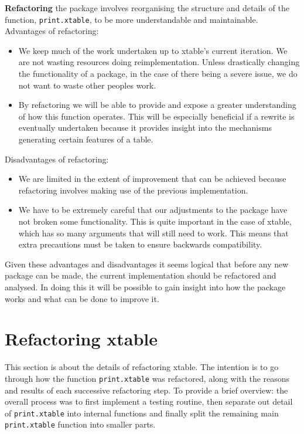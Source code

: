 \documentclass{memoir}\usepackage[]{graphicx}\usepackage[]{color}
\newcommand{\pkg}[1]{{\fontseries{b}\selectfont #1}}
\let\code=\texttt
\begin{document}
\textbf{Refactoring} the package involves reorganising the structure and details of the function, \code{print.xtable}, to be more understandable and maintainable.\\%

\noindent Advantages of refactoring:
\begin{itemize}
\item We keep much of the work undertaken up to \pkg{xtable's} current iteration. We are not wasting resources doing reimplementation. Unless drastically changing the functionality of a package, in the case of there being a severe issue, we do not want to waste other peoples work.
\item By refactoring we will be able to provide and expose a greater understanding of how this function operates. This will be especially beneficial if a rewrite is eventually undertaken because it provides insight into the mechanisms generating certain features of a table.
\end{itemize}
Disadvantages of refactoring:
\begin{itemize}
\item We are limited in the extent of improvement that can be achieved because refactoring involves making use of the previous implementation.
\item We have to be extremely careful that our adjustments to the package have not broken some functionality. This is quite important in the case of \pkg{xtable}, which has so many arguments that will still need to work. This means that extra precautions must be taken to ensure backwards compatibility.
\end{itemize}

Given these advantages and disadvantages it seems logical that before any new package can be made, the current implementation should be refactored and analysed. In doing this it will be possible to gain insight into how the package works and what can be done to improve it. 

\chapter{Refactoring xtable}

This section is about the details of refactoring \pkg{xtable}. The intention is to go through how the function \code{print.xtable} was refactored, along with the reasons and results of each successive refactoring step. To provide a brief overview: the overall process was to first implement a testing routine, then separate out detail of \code{print.xtable} into internal functions and finally split the remaining main \code{print.xtable} function into smaller parts.
\end{document}
